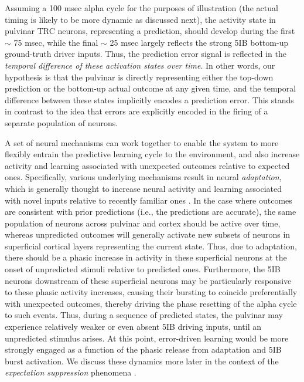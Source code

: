 \documentclass[11pt,twoside]{article}
\newif\myifpdf
\begin{document}
Assuming a 100 msec alpha cycle for the purposes of illustration (the actual timing is likely to be more dynamic as discussed next), the activity state in pulvinar TRC neurons, representing a prediction, should develop during the first $\sim$ 75 msec, while the final $\sim$ 25 msec largely reflects the strong 5IB bottom-up ground-truth driver inputs.  Thus, the prediction error signal is reflected in the \emph{temporal difference of these activation states over time}.  In other words, our hypothesis is that the pulvinar is directly representing either the top-down prediction or the bottom-up actual outcome at any given time, and the temporal difference between these states implicitly encodes a prediction error. This stands in contrast to the idea that errors are explicitly encoded in the firing of a separate population of neurons.

A set of neural mechanisms can work together to enable the system to more flexibly entrain the predictive learning  cycle to the environment, and also increase activity and learning associated with unexpected outcomes relative to expected ones.  Specifically, various underlying mechanisms result in neural \emph{adaptation}, which is generally thought to increase neural activity and learning associated with novel inputs relative to recently familiar ones \citep{MullerMethaKrauskopfEtAl99,AbbottVarelaSenEtAl97,BretteGerstner05,Grill-SpectorHensonMartin06,Hennig13}.  In the case where outcomes are consistent with prior predictions (i.e., the predictions are accurate), the same population of neurons across pulvinar and cortex should be active over time, whereas unpredicted outcomes will generally activate new subsets of neurons in superficial cortical layers representing the current state.  Thus, due to adaptation, there should be a phasic increase in activity in these superficial neurons at the onset of unpredicted stimuli relative to predicted ones.  Furthermore, the 5IB neurons downstream of these superficial neurons may be particularly responsive to these phasic activity increases, causing their bursting to coincide preferentially with unexpected outcomes, thereby driving the phase resetting of the alpha cycle to such events.  Thus, during a sequence of predicted states, the pulvinar may experience relatively weaker or even absent 5IB driving inputs, until an unpredicted stimulus arises.  At this point, error-driven learning would be more strongly engaged as a function of the phasic release from adaptation and 5IB burst activation.  We discuss these dynamics more later in the context of the \emph{expectation suppression} phenomena \citep{SummerfieldTrittschuhMontiEtAl08,TodorovicEdeMarisEtAl11,MeyerOlson11,BastosUsreyAdamsEtAl12}.
\end{document}
